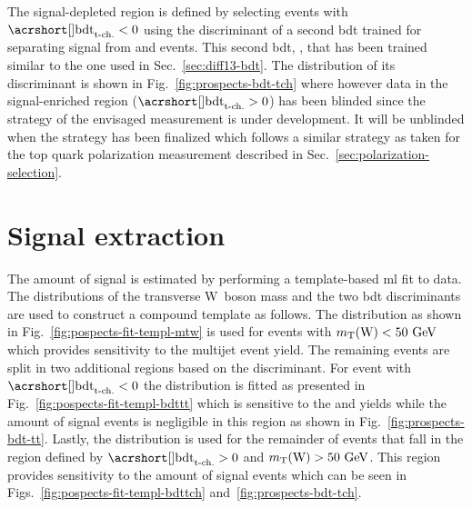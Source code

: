 
The signal-depleted region is defined by selecting events with $\bdttch<0$ using the discriminant of a second \gls{bdt} trained for separating signal from \wjets and \ttbar events. This second \gls{bdt}, \bdttch, that has been trained similar to the one used in Sec.~\ref{sec:diff13-bdt}. The distribution of its discriminant is shown in Fig.~\ref{fig:prospects-bdt-tch} where however data in the signal-enriched region ($\bdttch>0$) has been blinded since the strategy of the envisaged measurement is under development. It will be unblinded when the strategy has been finalized which follows a similar strategy as taken for the top quark polarization measurement described in Sec.~\ref{sec:polarization-selection}.


\section{Signal extraction}
\label{sec:prospects-fit}

The amount of signal is estimated by performing a template-based \gls{ml} fit to data. The distributions of the transverse W~boson mass and the two \gls{bdt} discriminants are used to construct a compound template as follows. The \mtw distribution as shown in Fig.~\ref{fig:pospects-fit-templ-mtw} is used for events with $m_{\textrm{T}}(\textrm{W})<50~\textrm{GeV}$ which provides sensitivity to the multijet event yield. The remaining events are split in two additional regions based on the \bdttch discriminant. For event with $\bdttch<0$ the \bdttt distribution is fitted as presented in Fig.~\ref{fig:pospects-fit-templ-bdttt} which is sensitive to the \wjets and \ttbar yields while the amount of signal events is negligible in this region as shown in Fig.~\ref{fig:prospects-bdt-tt}. Lastly, the \bdttch distribution is used for the remainder of events that fall in the region defined by $\bdttch>0$ and $m_{\textrm{T}}(\textrm{W})>50~\textrm{GeV}$. This region provides sensitivity to the amount of signal events which can be seen in Figs.~\ref{fig:pospects-fit-templ-bdttch} and~\ref{fig:prospects-bdt-tch}.

